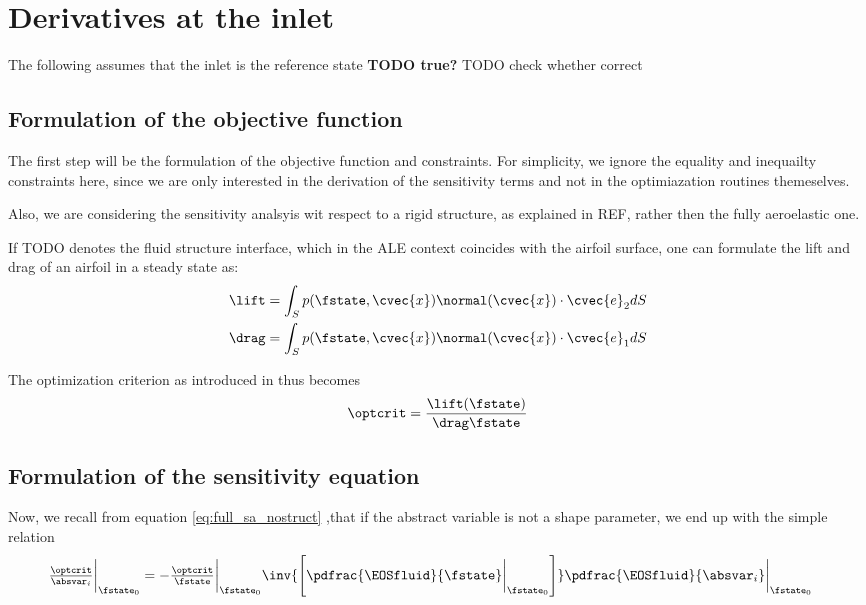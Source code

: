 \documentclass[../main.tex]{subfiles}
\begin{document}
\section{Derivatives at the inlet}
The following assumes that the inlet is the reference state \textbf{TODO true?}
TODO check whether correct











\clear
\cleardoublepage

%
\subsection{Formulation of the objective function}
The first step will be the formulation of the objective function and constraints. For simplicity, we ignore the equality and inequailty constraints here, since we are only interested in the derivation of the sensitivity terms and not in the optimiazation routines themeselves.

Also, we are considering the sensitivity analsyis wit respect to a rigid structure, as explained in REF, rather then the fully aeroelastic one.

If TODO denotes the fluid structure interface, which in the \ac{ALE} context coincides with the airfoil surface, one can formulate the lift and drag of an airfoil in a steady state as:
\begin{align}
\lift=\int_{S} p(\fstate,\cvec{x}) \normal(\cvec{x})\cdot \cvec{e}_2 dS \\
\drag=\int_{S} p(\fstate,\cvec{x}) \normal(\cvec{x})\cdot \cvec{e}_1 dS \\
\end{align}

The optimization criterion as introduced in \REF thus becomes
\begin{align}
\optcrit=\frac{\lift(\fstate)}{\drag\fstate}
\end{align}


\subsection{Formulation of the sensitivity equation}
Now, we recall from equation \eqref{eq:full_sa_nostruct} ,that if the abstract variable is not a shape parameter, we end up with the simple relation
\begin{align}\label{eq:manualmach_ToptcritBYabsvarI_expansion}
\tfrac{\optcrit}{\absvar_i}\bigg\rvert_{\fstate_0} &=
-\tfrac{\optcrit}{\fstate}\bigg\rvert_{\fstate_0}
\inv{\left[\pdfrac{\EOSfluid}{\fstate}\bigg\rvert_{\fstate_0}\right]}
\pdfrac{\EOSfluid}{\absvar_i}\bigg\rvert_{\fstate_0}
\end{align}
\end{document}
